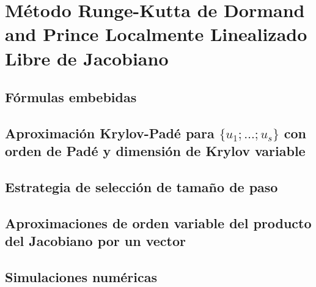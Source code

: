 \chapter{Método Runge-Kutta de Dormand and Prince Localmente Linealizado Libre de Jacobiano}\label{chapter:lldp-fj}

\section{Fórmulas embebidas}

\section{Aproximación Krylov-Padé para \texorpdfstring{$\{u_1;\ldots;u_s\}$}{u\_1,...,u\_s} con orden de Padé y dimensión de Krylov variable}

\section{Estrategia de selección de tamaño de paso}

\section{Aproximaciones de orden variable del producto del Jacobiano por un vector}

\section{Simulaciones numéricas}